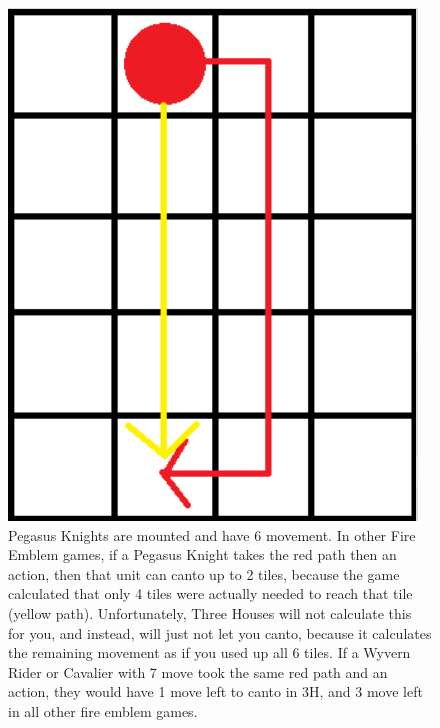 \begin{figure}[h]
\centerline{\includegraphics[scale=.4]{./General Information/canto.png}}
\caption{Pegasus Knights are mounted and have 6 movement. In other Fire Emblem games, if a Pegasus Knight takes the red path then an action, then that unit can canto up to 2 tiles, because the game calculated that only 4 tiles were actually needed to reach that tile (yellow path). Unfortunately, Three Houses will not calculate this for you, and instead, will just not let you canto, because it calculates the remaining movement as if you used up all 6 tiles. If a Wyvern Rider or Cavalier with 7 move took the same red path and an action, they would have 1 move left to canto in 3H, and 3 move left in all other fire emblem games.}
\end{figure}

